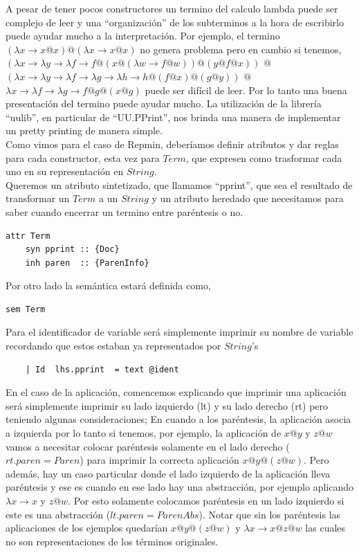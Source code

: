 \documentclass[a4paper,10pt]{article}
\begin{document}
A pesar de tener pocos constructores un termino del calculo lambda puede ser 
complejo de leer y una ``organización'' de los subterminos a la hora de escribirlo
puede ayudar mucho a la interpretación. Por ejemplo, el termino
$(\lambda x \rightarrow x@x)@(\lambda x \rightarrow x@x)$ no genera problema pero en
cambio si tenemos, 
$(\lambda x \rightarrow
	\lambda y \rightarrow
		\lambda f \rightarrow f @ (x @ (\lambda w \rightarrow f @ w)) @ (y @ f @ x))$
$@$
$(\lambda x \rightarrow 
	\lambda y \rightarrow \lambda f \rightarrow 
	\lambda g \rightarrow \lambda h \rightarrow h @ (f @ x) @ (g @ y))$
$@$ $\lambda x \rightarrow \lambda f \rightarrow 
		\lambda g \rightarrow f @ g @ (x @ g)$
puede ser difícil de leer. Por lo tanto una buena presentación del termino puede
ayudar mucho. La utilización de la librería ``uulib'', en particular de ``UU.PPrint'', 
nos brinda una manera de implementar un pretty printing de manera simple.\\

Como vimos para el caso de Repmin, deberíamos definir atributos y dar reglas para
cada constructor, esta vez para $Term$, que expresen como trasformar cada uno en
su representación en $String$.\\

Queremos un atributo sintetizado, que llamamos ``pprint'', que sea el resultado
de transformar un $Term$ a un $String$ y un atributo heredado que necesitamos para
saber cuando encerrar un termino entre paréntesis o no.

\begin{lstlisting}
attr Term 
    syn pprint :: {Doc}
    inh paren  :: {ParenInfo}
\end{lstlisting}

Por otro lado la semántica estará definida como,

\begin{lstlisting}    
sem Term
\end{lstlisting}
Para el identificador de variable será simplemente imprimir su nombre de variable
recordando que estos estaban ya representados por $String$'s
\begin{lstlisting}    
    | Id  lhs.pprint  = text @ident
\end{lstlisting}

En el caso de la aplicación, comencemos explicando que imprimir una aplicación será
simplemente imprimir su lado izquierdo (lt) y su lado derecho (rt) pero teniendo
algunas consideraciones; En cuando a los paréntesis, la aplicación asocia a izquierda
por lo tanto si tenemos, por ejemplo, la aplicación de $x@y$ y $z@w$ vamos a necesitar
colocar paréntesis solamente en el lado derecho ($rt.paren = Paren$) para imprimir la
correcta aplicación $x@y@(z@w)$. Pero además, hay un caso particular donde el lado
izquierdo de la aplicación lleva paréntesis y ese es cuando en ese lado hay una
abstracción, por ejemplo aplicando $\lambda x \rightarrow x$ y $z@w$. Por esto solamente
colocamos paréntesis en un lado izquierdo si este es una abstracción ($lt.paren = ParenAbs$).
Notar que sin los paréntesis las aplicaciones de los ejemplos quedarían $x@y@(z@w)$ y 
$\lambda x \rightarrow x@z@w$ las cuales no son representaciones de los términos originales.\\
\end{document}
